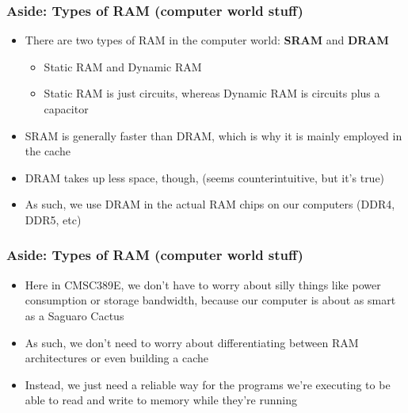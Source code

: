 \documentclass{beamer}
\begin{document}
             \begin{frame}
             	\frametitle{Aside: Types of RAM (computer world stuff)}
             	\begin{itemize}
             		\item There are two types of RAM in the computer world: \textbf{SRAM} and \textbf{DRAM}
             		\begin{itemize}
             			\item Static RAM and Dynamic RAM
             			\item Static RAM is just circuits, whereas Dynamic RAM is circuits plus a capacitor
             		\end{itemize}
             		\item SRAM is generally faster than DRAM, which is why it is mainly employed in the cache
             		\item DRAM takes up less space, though, (seems counterintuitive, but it's true)
             		\item As such, we use DRAM in the actual RAM chips on our computers (DDR4, DDR5, etc)
             	\end{itemize}
             \end{frame}
             
             \begin{frame}
             	\frametitle{Aside: Types of RAM (computer world stuff)}
             	\begin{itemize}
             		\item Here in CMSC389E, we don't have to worry about silly things like power consumption or storage bandwidth, because our computer is about as smart as a Saguaro Cactus
             		\item As such, we don't need to worry about differentiating between RAM architectures or even building a cache
             		\item Instead, we just need a reliable way for the programs we're executing to be able to read and write to memory while they're running
             	\end{itemize}
             \end{frame}
             
\end{document}

